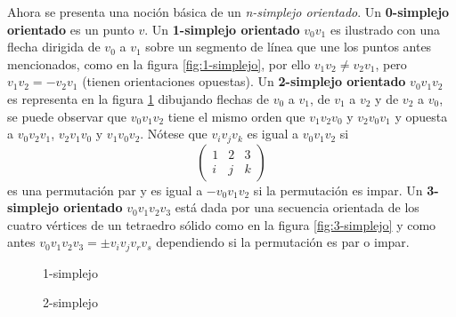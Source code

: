 \documentclass[12pt]{book}
\theoremstyle{definition}
\newcounter{in}
\newcounter{ini}
\begin{document}
Ahora se presenta una noción básica de un \textit{n-simplejo
  orientado}. Un \textbf{0-simplejo orientado} es un punto $v$. Un
\textbf{1-simplejo orientado} $v_0v_{1}$ es ilustrado con una flecha
dirigida de $v_0$ a $v_{1}$ sobre un segmento de línea que une los
puntos antes mencionados, como en la figura \ref{fig:1-simplejo}, por ello
$v_{1}v_{2} \neq v_{2}v_{1}$, pero $v_{1}v_{2} = -v_{2}v_{1}$ (tienen
orientaciones opuestas). Un \textbf{2-simplejo orientado}
$v_{0}v_{1}v_{2}$ es representa en la figura \ref{fig:2-simplejo}
dibujando flechas de $v_{0}$ a $v_{1}$, de $v_{1}$ a $v_{2}$ y de $v_{2}$ a $v_{0}$, se
puede observar que $v_{0}v_{1}v_{2}$ tiene el mismo orden que
$v_{1}v_{2}v_{0}$ y $v_{2}v_{0}v_{1}$ y opuesta a $v_{0}v_{2}v_{1}$,
$v_{2}v_{1}v_{0}$ y $v_{1}v_{0}v_{2}$.
Nótese que $v_{i}v_{j}v_{k}$ es igual a $v_{0}v_{1}v_{2}$ si
\begin{equation}
  \label{eq:88}
  \begin{pmatrix}
    1 & 2 & 3 \\
    i & j & k
  \end{pmatrix} 
\end{equation}
es una permutación par y es igual a $-v_{0}v_{1}v_{2}$ si la
permutación es impar. Un \textbf{3-simplejo orientado}
$v_{0}v_{1}v_{2}v_{3}$ está dada por una secuencia orientada de los
cuatro vértices de un tetraedro sólido como en la figura
\ref{fig:3-simplejo} y como antes
$v_{0}v_{1}v_{2}v_{3} = \pm v_{i}v_{j}v_{r}v_{s}$ dependiendo si la
permutación es par o impar.


\begin{figure}[h]
  \centering
  \begin{minipage}[h]{0.45\linewidth}
    \centering
  
    \caption{1-simplejo}
    \label{fig:1-simplejo}
  \end{minipage}
  \begin{minipage}[h]{0.45\linewidth}
    \centering
  
    \caption{2-simplejo}
    \label{fig:2-simplejo}
  \end{minipage}
\end{figure}
\end{document}
